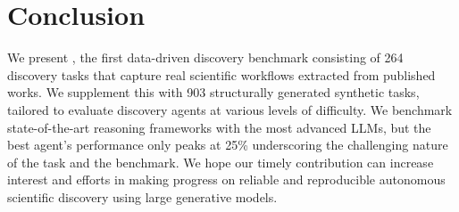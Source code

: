 \section{Conclusion}
\label{sec:conclusion}
We present \discoverybench, the first data-driven discovery benchmark consisting of 264 discovery tasks that capture real scientific workflows extracted from published works. We supplement this with 903 structurally generated synthetic tasks, tailored to evaluate discovery agents at various levels of difficulty. We benchmark state-of-the-art reasoning frameworks with the most advanced LLMs, but the best agent's performance only peaks at 25\% underscoring the challenging nature of the task and the benchmark. We hope our timely contribution can increase interest and efforts in making progress on reliable and reproducible autonomous scientific discovery using large generative models. 


